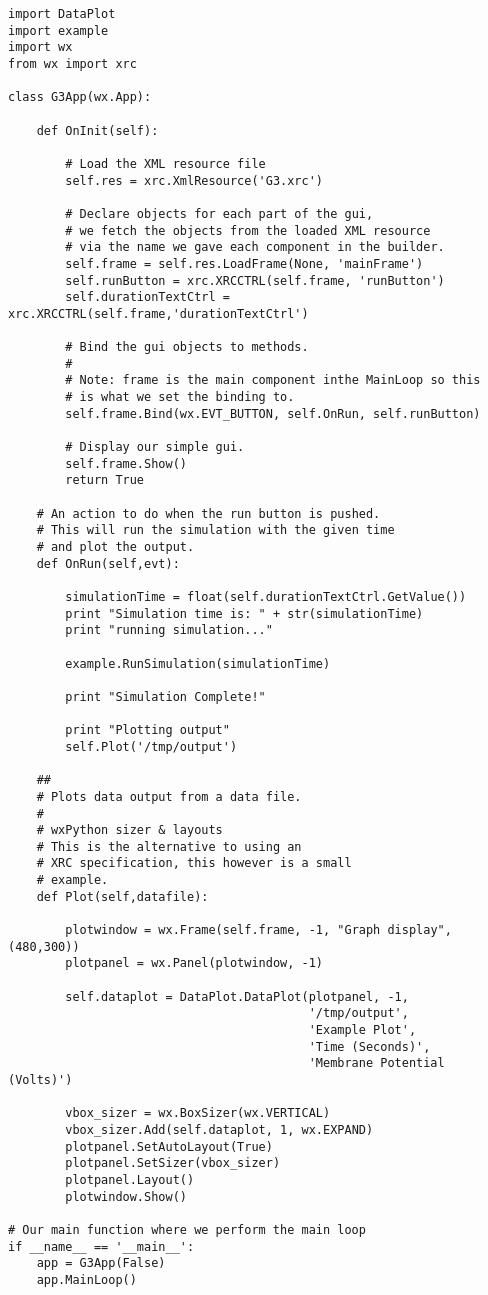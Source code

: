 \documentclass[10pt]{article}
\begin{document}
\begin{verbatim}
import DataPlot
import example
import wx
from wx import xrc

class G3App(wx.App):

    def OnInit(self):

        # Load the XML resource file
        self.res = xrc.XmlResource('G3.xrc')

        # Declare objects for each part of the gui,
        # we fetch the objects from the loaded XML resource
        # via the name we gave each component in the builder.
        self.frame = self.res.LoadFrame(None, 'mainFrame')
        self.runButton = xrc.XRCCTRL(self.frame, 'runButton')
        self.durationTextCtrl = xrc.XRCCTRL(self.frame,'durationTextCtrl')

        # Bind the gui objects to methods.
        #
        # Note: frame is the main component inthe MainLoop so this
        # is what we set the binding to. 
        self.frame.Bind(wx.EVT_BUTTON, self.OnRun, self.runButton)

        # Display our simple gui.
        self.frame.Show()
        return True       

    # An action to do when the run button is pushed.
    # This will run the simulation with the given time
    # and plot the output.
    def OnRun(self,evt):

        simulationTime = float(self.durationTextCtrl.GetValue())
        print "Simulation time is: " + str(simulationTime)
        print "running simulation..."

        example.RunSimulation(simulationTime)

        print "Simulation Complete!"

        print "Plotting output"
        self.Plot('/tmp/output')

    ##
    # Plots data output from a data file.
    #
    # wxPython sizer & layouts
    # This is the alternative to using an
    # XRC specification, this however is a small
    # example.
    def Plot(self,datafile):

        plotwindow = wx.Frame(self.frame, -1, "Graph display", (480,300))
        plotpanel = wx.Panel(plotwindow, -1)

        self.dataplot = DataPlot.DataPlot(plotpanel, -1,
                                          '/tmp/output',
                                          'Example Plot',
                                          'Time (Seconds)',
                                          'Membrane Potential (Volts)')

        vbox_sizer = wx.BoxSizer(wx.VERTICAL)
        vbox_sizer.Add(self.dataplot, 1, wx.EXPAND)
        plotpanel.SetAutoLayout(True)
        plotpanel.SetSizer(vbox_sizer)
        plotpanel.Layout()
        plotwindow.Show()

# Our main function where we perform the main loop
if __name__ == '__main__':
    app = G3App(False)
    app.MainLoop()
\end{verbatim}
\end{document}
